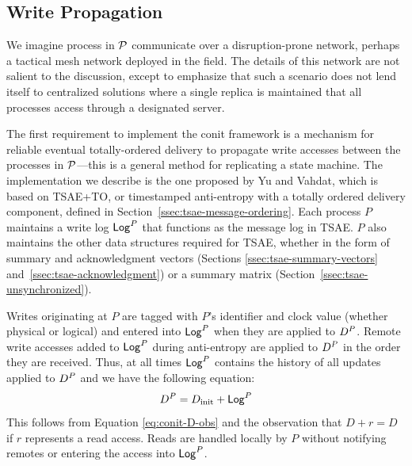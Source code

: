 \documentclass[]             %
{NASA}                       %
\theoremstyle{definition}
\begin{document}
\subsection{Write Propagation}
\label{ssec:conit-write-propagation}
We imagine process in $\mathcal{P}$ communicate over a disruption-prone
network, perhaps a tactical mesh network deployed in the field. The
details of this network are not salient to the discussion, except to
emphasize that such a scenario does not lend itself to centralized
solutions where a single replica is maintained that all processes
access through a designated server.

The first requirement to implement the conit framework is a mechanism
for reliable eventual totally-ordered delivery to propagate write
accesses between the processes in $\mathcal{P}$---this is a general
method for replicating a state machine. The implementation we describe
is the one proposed by Yu and Vahdat, which is based on TSAE+TO, or
timestamped anti-entropy with a totally ordered delivery component,
defined in Section~\ref{ssec:tsae-message-ordering}. Each process $P$
maintains a write log $\mathsf{Log}^{P}$ that functions as the message log in
TSAE. $P$ also maintains the other data structures required for TSAE,
whether in the form of summary and acknowledgment vectors (Sections
\ref{ssec:tsae-summary-vectors} and~\ref{ssec:tsae-acknowledgment}) or
a summary matrix (Section~\ref{ssec:tsae-unsynchronized}).

Writes originating at $P$ are tagged with $P$'s identifier and clock
value (whether physical or logical) and entered into $\mathsf{Log}^{P}$ when
they are applied to $D^{P}$. Remote write accesses added to $\mathsf{Log}^{P}$
during anti-entropy are applied to $D^{P}$ in the order they are
received.  Thus, at all times $\mathsf{Log}^{P}$ contains the history of all
updates applied to $D^{P}$ and we have the following equation:
\begin{equation}
  D^{P} = D_\textrm{init} + \mathsf{Log}^{P} \label{eq:conit-DP}
\end{equation}
This follows from Equation \eqref{eq:conit-D-obs} and the observation
that $D + r = D$ if $r$ represents a read access. Reads are handled
locally by $P$ without notifying remotes or entering the access into
$\mathsf{Log}^{P}$.

\end{document}
